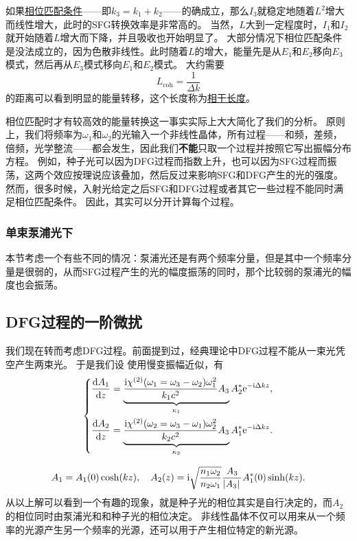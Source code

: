 \documentclass[UTF8, a4paper]{ctexart}
\newcommand*{\ee}{\mathrm{e}}
\newcommand*{\ii}{\mathrm{i}}
\newcommand{\concept}[1]{\underline{#1}}
\renewcommand{\emph}{\textbf}
\begin{document}
如果\concept{相位匹配条件}——即$k_3 = k_1 + k_2$——的确成立，那么$I_3$就稳定地随着$L^2$增大而线性增大，此时的SFG转换效率是非常高的。
当然，$L$大到一定程度时，$I_1$和$I_2$就开始随着$L$增大而下降，并且吸收也开始明显了。
大部分情况下相位匹配条件是没法成立的，因为色散非线性。此时随着$L$的增大，能量先是从$E_1$和$E_2$移向$E_3$模式，然后再从$E_3$模式移向$E_1$和$E_2$模式。
大约需要
\begin{equation}
    L_\text{coh} = \frac{1}{\Delta k}
\end{equation}
的距离可以看到明显的能量转移，这个长度称为\concept{相干长度}。

相位匹配时才有较高效的能量转换这一事实实际上大大简化了我们的分析。
原则上，我们将频率为$\omega_1$和$\omega_2$的光输入一个非线性晶体，所有过程——和频，差频，倍频，光学整流——都会发生，因此我们\emph{不能}只取一个过程并按照它写出振幅分布方程。
例如，种子光可以因为DFG过程而指数上升，也可以因为SFG过程而振荡，这两个效应按理说应该叠加，然后反过来影响SFG和DFG产生的光的强度。
然而，很多时候，入射光给定之后SFG和DFG过程或者其它一些过程不能同时满足相位匹配条件。
因此，其实可以分开计算每个过程。

\subsubsection{单束泵浦光下}

本节考虑一个有些不同的情况：泵浦光还是有两个频率分量，但是其中一个频率分量是很弱的，从而SFG过程产生的光的幅度振荡的同时，那个比较弱的泵浦光的幅度也会振荡。

\subsection{DFG过程的一阶微扰}

我们现在转而考虑DFG过程。前面提到过，经典理论中DFG过程不能从一束光凭空产生两束光。
于是我们设
使用慢变振幅近似，有
\begin{equation}
    \left\{
        \begin{aligned}
            \dv{A_1}{z} &= \underbrace{\frac{\ii \chi^{(2)}(\omega_1 = \omega_3 - \omega_2) \omega_1^2}{k_1 c^2} A_3}_{\kappa_1} A_2^* \ee^{-\ii \Delta k z}, \\
            \dv{A_2}{z} &= \underbrace{\frac{\ii \chi^{(2)}(\omega_2 = \omega_3 - \omega_1) \omega_2^2}{k_2 c^2} A_3}_{\kappa_2} A_1^* \ee^{-\ii \Delta k z}.
        \end{aligned}
    \right.
\end{equation}

\begin{equation}
    A_1 = A_1(0) \cosh(kz), \quad A_2(z) = \ii \sqrt{\frac{n_1 \omega_2}{n_2 \omega_1}} \frac{A_3}{\abs*{A_3}} A_1^*(0) \sinh(kz).
\end{equation}
从以上解可以看到一个有趣的现象，就是种子光的相位其实是自行决定的，而$A_2$的相位同时由泵浦光和和种子光的相位决定。
非线性晶体不仅可以用来从一个频率的光源产生另一个频率的光源，还可以用于产生相位特定的新光源。
\end{document}
